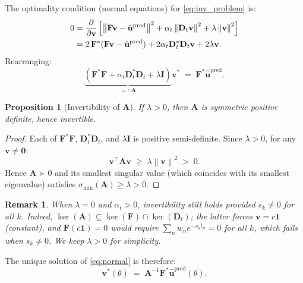 \documentclass[11pt, a4paper]{article}
\newtheorem{proposition}[theorem]{Proposition}
\newtheorem{remark}[theorem]{Remark}
\newcommand{\norm}[1]{\left\|#1\right\|}
\begin{document}
The optimality condition (normal equations) for \eqref{eq:inv_problem} is:
\begin{align}
  0 &= \frac{\partial}{\partial \mathbf{v}}
  \left[
    \norm{\mathbf{F}\mathbf{v} - \hat{\mathbf{u}}^{\mathrm{pred}}}^2
    + \alpha_t\norm{\mathbf{D}_t\mathbf{v}}^2
    + \lambda\norm{\mathbf{v}}^2
  \right] \notag \\
  &= 2\,\mathbf{F}^*(\mathbf{F}\mathbf{v} - \hat{\mathbf{u}}^{\mathrm{pred}})
     + 2\alpha_t \mathbf{D}_t^*\mathbf{D}_t\mathbf{v}
     + 2\lambda\mathbf{v}. \notag
\end{align}
Rearranging:
\begin{equation}
  \label{eq:normal}
  \underbrace{
    \left(\mathbf{F}^*\mathbf{F}
    + \alpha_t\mathbf{D}_t^*\mathbf{D}_t
    + \lambda\mathbf{I}\right)
  }_{=:\,\mathbf{A}}
  \mathbf{v}^*
  \;=\;
  \mathbf{F}^* \hat{\mathbf{u}}^{\mathrm{pred}}.
\end{equation}

\begin{proposition}[Invertibility of $\mathbf{A}$]
  \label{prop:invertible}
  If $\lambda > 0$, then $\mathbf{A}$ is symmetric positive definite,
  hence invertible.
\end{proposition}

\begin{proof}
  Each of $\mathbf{F}^*\mathbf{F}$, $\mathbf{D}_t^*\mathbf{D}_t$, and
  $\lambda\mathbf{I}$ is positive semi-definite.
  Since $\lambda > 0$, for any $\mathbf{v} \neq \mathbf{0}$:
  \[
    \mathbf{v}^\top \mathbf{A} \mathbf{v}
    \;\geq\; \lambda\norm{\mathbf{v}}^2 \;>\; 0.
  \]
  Hence $\mathbf{A} \succ 0$ and its smallest singular value (which coincides with its smallest eigenvalue) satisfies $\sigma_{\min}(\mathbf{A}) \geq \lambda > 0$.
\end{proof}

\begin{remark}
  When $\lambda = 0$ and $\alpha_t > 0$, invertibility still holds provided
  $s_k \neq 0$ for all $k$. Indeed, $\ker(\mathbf{A}) \subseteq
  \ker(\mathbf{F}) \cap \ker(\mathbf{D}_t)$; the latter forces $\mathbf{v} = c\mathbf{1}$
  (constant), and $\mathbf{F}(c\mathbf{1}) = 0$ would require
  $\sum_n w_n e^{-s_k t_n} = 0$ for all $k$, which fails when $s_k \neq 0$.
  We keep $\lambda > 0$ for simplicity.
\end{remark}

The unique solution of \eqref{eq:normal} is therefore:
\begin{equation}
  \label{eq:solution}
  \boxed{
    \mathbf{v}^*(\theta)
    \;=\;
    \mathbf{A}^{-1}\mathbf{F}^* \hat{\mathbf{u}}^{\mathrm{pred}}(\theta).
  }
\end{equation}
\end{document}

